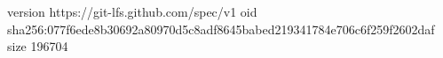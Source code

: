 version https://git-lfs.github.com/spec/v1
oid sha256:077f6ede8b30692a80970d5c8adf8645babed219341784e706c6f259f2602daf
size 196704
